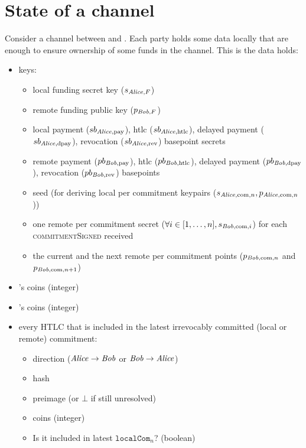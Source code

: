 \section{State of a channel}
  Consider a channel between \alice{} and \bob. Each party holds some data
  locally that are enough to ensure ownership of some funds in the channel. This
  is the data \alice{} holds:

  \begin{itemize}
    \item keys:
    \begin{itemize}
      \item local funding secret key ($s_{\mathit{Alice}, F}$)
      \item remote funding public key ($p_{\mathit{Bob}, F}$)
      \item local payment ($sb_{\mathit{Alice}, \mathrm{pay}}$), htlc ($sb_{\mathit{Alice},
      \mathrm{htlc}}$), delayed payment ($sb_{\mathit{Alice}, \mathrm{dpay}}$),
      revocation ($sb_{\mathit{Alice}, \mathrm{rev}}$) basepoint secrets
      \item remote payment ($pb_{\mathit{Bob}, \mathrm{pay}}$), htlc ($pb_{\mathit{Bob},
      \mathrm{htlc}}$), delayed payment ($pb_{\mathit{Bob}, \mathrm{dpay}}$), revocation
      ($pb_{\mathit{Bob}, \mathrm{rev}}$) basepoints
      \item seed (for deriving local per commitment keypairs ($s_{\mathit{Alice},
      \mathrm{com}, n}, p_{\mathit{Alice}, \mathrm{com}, n}$))
      \item one remote per commitment secret ($\forall i \in [1, \dots, n],
      s_{\mathit{Bob}, \mathrm{com}, i}$) for each \textsc{commitmentSigned} received
      \item the current and the next remote per commitment points ($p_{\mathit{Bob},
      \mathrm{com}, n}$ and $p_{\mathit{Bob}, \mathrm{com}, n + 1}$)
    \end{itemize}
    \item \alice's coins (integer)
    \item \bob's coins (integer)
    \item every HTLC that is included in the latest irrevocably committed (local
    or remote) commitment:
      \begin{itemize}
        \item direction ($\mathit{Alice} \rightarrow \mathit{Bob}$ or $\mathit{Bob} \rightarrow \mathit{Alice}$)
        \item hash
        \item preimage (or $\bot$ if still unresolved)
        \item coins (integer)
        \item Is it included in latest $\mathtt{localCom}_n$? (boolean)

\end{itemize}
\end{itemize}
